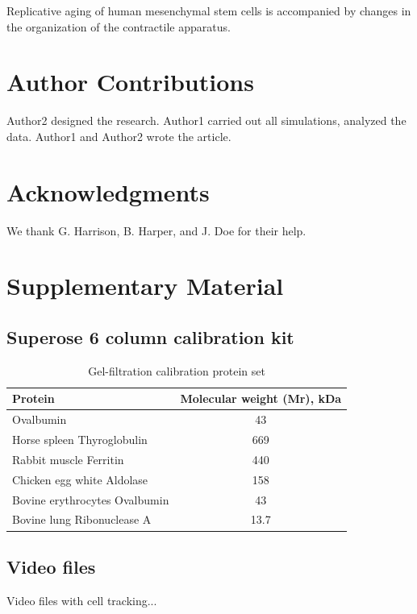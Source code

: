 \documentclass[english,authoryear]{elsarticle}
\begin{document}
Replicative aging of human mesenchymal stem cells is accompanied by changes in the organization of the contractile apparatus.

\section*{Author Contributions}

Author2 designed the research. Author1 carried out all simulations, analyzed the data. Author1 and Author2 wrote the article.

\section*{Acknowledgments}

We thank G. Harrison, B. Harper, and J. Doe for their help.

%
%
%


\section*{Supplementary Material}

\subsection{Superose 6 column calibration kit}

\begin{table}[h]
  \caption{Gel-filtration calibration protein set}
  \label{calibration}
\centering
\begin{tabular}{l|c|}
 Protein & Molecular weight (Mr), kDa  \\
 \hline
 Ovalbumin & 43 \\
 Horse spleen Thyroglobulin & 669 \\
 Rabbit muscle Ferritin & 440 \\
 Chicken egg white Aldolase & 158 \\
 Bovine erythrocytes Ovalbumin & 43 \\
 Bovine lung Ribonuclease A & 13.7
\end{tabular}
\end{table}

\subsection*{Video files}

Video files with cell tracking...
\end{document}

